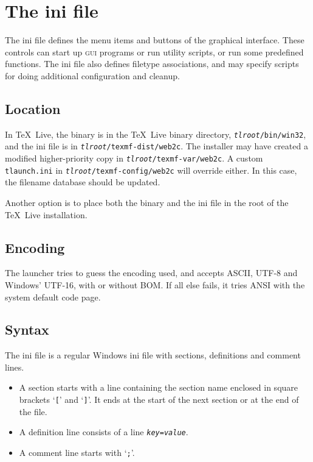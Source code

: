 \documentclass[11pt,a4paper,oneside]{report}
\def\TL{\TeX~Live}
\def\mysc#1{{\rmfamily\textsc{#1}}}
\def\GUI{\mysc{gui}}
\begin{document}
\section{The ini file}
\label{sec:config}

The ini file defines the menu items and buttons of the graphical
interface. These controls can start up \GUI{} programs or run
utility scripts, or run some predefined functions. The ini file also
defines filetype associations, and may specify scripts for doing
additional configuration and cleanup.

\subsection{Location}
\label{sec:loc}

In \TL, the binary is in the \TL{} binary directory,
\texttt{\emph{tlroot}/bin/win32}, and the ini file is in
\texttt{\emph{tlroot}/texmf-dist/web2c}. The installer may have
created a modified higher-priority copy in
\texttt{\emph{tlroot}/texmf-var/web2c}. A custom
\texttt{tlaunch.ini} in \texttt{\emph{tlroot}/texmf-config/web2c}
will override either. In this case, the filename database should be
updated.

Another option is to place both the binary and the ini file in the
root of the \TL{} installation.

\subsection{Encoding}
\label{sec:enc}

The launcher tries to guess the encoding used, and accepts
ASCII, UTF-8 and Windows' UTF-16, with or without BOM. If all else
fails, it tries ANSI with the system default code page.

\subsection{Syntax}
\label{sec:synt}

The ini file is a regular Windows ini file with sections,
definitions and comment lines.
\begin{itemize}
\item A section starts with a line containing the section name
  enclosed in square brackets `\texttt{[}' and `\texttt{]}'. It ends
  at the start of the next section or at the end of the file.
\item A definition line consists of a line
  \texttt{\emph{key}=\emph{value}}.
\item A comment line starts with `\texttt{;}'.
\end{itemize}
\end{document}
